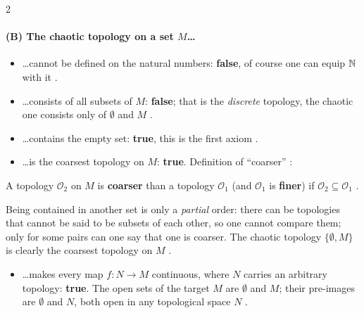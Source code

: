 \begin{paracol}{2}
\paragraph{(B) The chaotic topology on a set $M$\dots}
\begin{itemize}
  \item \dots cannot be defined on the natural numbers: \textbf{false}, of course one can equip $\mathbb{N}$ with it .
  \item \dots consists of all subsets of $M$: \textbf{false}; that is the \emph{discrete} topology, the chaotic one consists only of $\emptyset$ and $M$ .
  \item \dots contains the empty set: \textbf{true}, this is the first axiom .
  \item \dots is the coarsest topology on $M$: \textbf{true}. Definition of ``coarser'' :
\end{itemize}
\begin{definition}\label{def:c01-coarser}
A topology $\mathcal O_2$ on $M$ is \textbf{coarser} than a topology $\mathcal O_1$ (and $\mathcal O_1$ is \textbf{finer}) if $\mathcal O_2\subseteq\mathcal O_1$
.
\end{definition}
Being contained in another set is only a \emph{partial} order: there can be topologies that cannot be said to be subsets of each other, so one cannot compare them; only for some pairs can one say that one
is coarser. The chaotic topology $\{\emptyset,M\}$ is clearly the coarsest topology on $M$ .
\begin{itemize}
  \item \dots makes every map $f\colon N\to M$ continuous, where $N$ carries an arbitrary topology: \textbf{true}. The open sets of the target $M$ are $\emptyset$ and $M$; their pre-images are
        $\emptyset$ and $N$, both open in any topological space $N$ .
\end{itemize}


\end{paracol}
